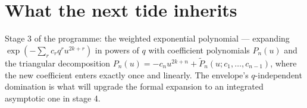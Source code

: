 \documentclass[11pt]{article}
\begin{document}
\section{What the next tide inherits}

Stage 3 of the programme: the weighted exponential polynomial ---
expanding $\exp(-\sum_r c_r q^r u^{2k+r})$ in powers of $q$ with
coefficient polynomials $P_n(u)$ and the triangular decomposition
$P_n(u) = -c_n u^{2k+n} + \widetilde{P}_n(u; c_1, \dots, c_{n-1})$,
where the new coefficient enters exactly once and linearly. The
envelope's $q$-independent domination is what will upgrade the formal
expansion to an integrated asymptotic one in stage 4.
\end{document}
